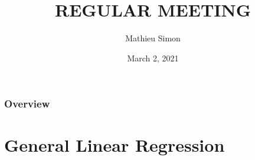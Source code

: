 \documentclass[xcolor=table]{beamer}
\title[Regular Meeting]{
\uppercase{Regular Meeting}
}
\author{Mathieu Simon}
\institute[University of Bern]
{
MSc - Biomedical Engineering \\
University of Bern, Faculty of Medicine \\
\medskip
}
\date{March 2, 2021}
\begin{document}
\begin{frame}
\titlepage
\end{frame}


\begin{frame}
	\frametitle{Overview}
	\tableofcontents
\end{frame}


\section{General Linear Regression}
\end{document}
